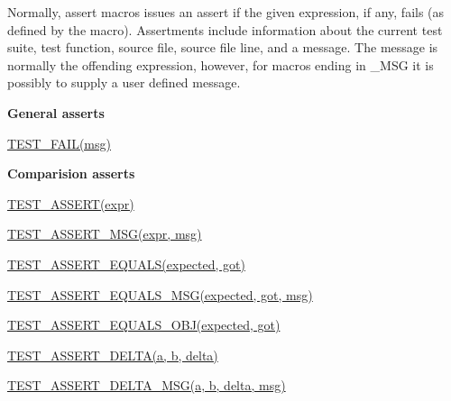 Normally, assert macros issues an assert if the given expression, if any, fails (as defined by the macro). Assertments include information about the current test suite, test function, source file, source file line, and a message. The message is normally the offending expression, however, for macros ending in \+\_\+\+M\+SG it is possibly to supply a user defined message.

{\bfseries General asserts}
\begin{DoxyItemize}
\item \hyperlink{cpptest-assert_8h_a947ab44cc42369eb7cfe33f8a1e38e4b}{T\+E\+S\+T\+\_\+\+F\+A\+I\+L(msg)}
\end{DoxyItemize}

{\bfseries Comparision asserts}
\begin{DoxyItemize}
\item \hyperlink{cpptest-assert_8h_ac7dd7b06eb85d9ad841d80cbf217b1f6}{T\+E\+S\+T\+\_\+\+A\+S\+S\+E\+R\+T(expr)}
\item \hyperlink{cpptest-assert_8h_ac612ede938734f9c8d898e05818882fb}{T\+E\+S\+T\+\_\+\+A\+S\+S\+E\+R\+T\+\_\+\+M\+S\+G(expr, msg)}
\item \hyperlink{cpptest-assert_8h_ae281f4d973e657b11691a97551f17dd1}{T\+E\+S\+T\+\_\+\+A\+S\+S\+E\+R\+T\+\_\+\+E\+Q\+U\+A\+L\+S(expected, got)}
\item \hyperlink{cpptest-assert_8h_ab8e9ce729f96abe74b76d98f9568a59c}{T\+E\+S\+T\+\_\+\+A\+S\+S\+E\+R\+T\+\_\+\+E\+Q\+U\+A\+L\+S\+\_\+\+M\+S\+G(expected, got, msg)}
\item \hyperlink{cpptest-assert_8h_aa506d98e8a5fc575df0361906f7deef8}{T\+E\+S\+T\+\_\+\+A\+S\+S\+E\+R\+T\+\_\+\+E\+Q\+U\+A\+L\+S\+\_\+\+O\+B\+J(expected, got)}
\item \hyperlink{cpptest-assert_8h_a9583b1709f4b9dfb3ff2849bfec5c885}{T\+E\+S\+T\+\_\+\+A\+S\+S\+E\+R\+T\+\_\+\+D\+E\+L\+T\+A(a, b, delta)}
\item \hyperlink{cpptest-assert_8h_afcd749452840bfde9be575ef22fcede0}{T\+E\+S\+T\+\_\+\+A\+S\+S\+E\+R\+T\+\_\+\+D\+E\+L\+T\+A\+\_\+\+M\+S\+G(a, b, delta, msg)}
\end{DoxyItemize}


